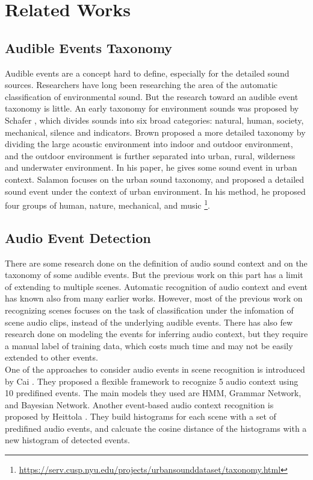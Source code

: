 \chapter{Related Works}
\section{Audible Events Taxonomy}
Audible events are a concept hard to define, especially for the detailed sound sources. 
Researchers have long been researching the area of the automatic classification of environmental sound. 
But the research toward an audible event taxonomy is little. 
An early taxonomy for environment sounds was proposed by Schafer \cite{schafer1993soundscape}, which divides sounds into six broad categories: natural, human, society, mechanical, silence and indicators. 
Brown \cite{brown2011towards} proposed a more detailed taxonomy by dividing the large acoustic environment into indoor and outdoor environment, and the outdoor environment is further separated into urban, rural, wilderness and underwater environment. 
In his paper, he gives some sound event in urban context.
Salamon \cite{salamon2014dataset} focuses on the urban sound taxonomy, and proposed a detailed sound event under the context of urban environment. 
In his method, he proposed four groups of human, nature, mechanical, and music \footnote{\url{https://serv.cusp.nyu.edu/projects/urbansounddataset/taxonomy.html}}. \\ 

\section{Audio Event Detection}
There are some research done on the definition of audio sound context and on the taxonomy of some audible events. 
But the previous work on this part has a limit of extending to multiple scenes. 
Automatic recognition of audio context and event has known also from many earlier works. 
However, most of the previous work on recognizing scenes focuses on the task of classification under the infomation of scene audio clips, instead of the underlying audible events. 
There has also few research done on modeling the events for inferring audio context, but they require a manual label of training data, which costs much time and may not be easily extended to other events. \\ 


One of the approaches to consider audio events in scene recognition is introduced by Cai  \cite{cai2006flexible}. 
They proposed a flexible framework to recognize 5 audio context using 10 predifined events. 
The main models they used are HMM, Grammar Network, and Bayesian Network. 
Another event-based audio context recognition is proposed by Heittola \cite{heittola2010audio}. 
They build histograms for each scene with a set of predifined audio events, and calcuate the cosine distance of the histograms with a new histogram of detected events.\\


